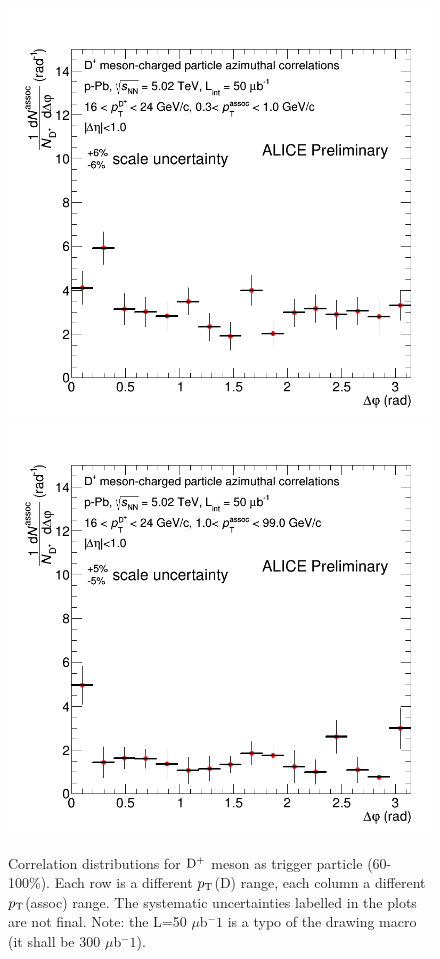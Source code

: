 \begin{figure}
{\includegraphics[width=0.32\linewidth]{figuresVsCent/Dplus/Correlations/60100/CanvaAndVariedHistopPbDplusPt16to24assocPt03to1.png}}
{\includegraphics[width=0.32\linewidth]{figuresVsCent/Dplus/Correlations/60100/CanvaAndVariedHistopPbDplusPt16to24assocPt1to99.png}}
 \caption{Correlation distributions for ${\rm D^+}$ meson as trigger particle (60-100\%). Each row is a different $p_{\rm T}$(D) range, each column a different $p_{\rm T}$(assoc) range. The systematic uncertainties labelled in the plots are not final. Note: the L=50 $\mu$b$^-1$ is a typo of the drawing macro (it shall be 300 $\mu$b$^-1$).}
\label{fig:Dpluscorr60100}
\end{figure}

